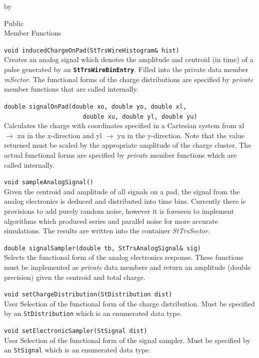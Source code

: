 \documentclass[twoside]{article}
\newcommand{\comp}[1]{\texttt{#1}}%
\newcommand{\entrylabel}[1]{\mbox{\textbf{{#1}}}\hfil}%
\newenvironment{entry}
{\begin{list}{}%
    {\renewcommand{\makelabel}{\entrylabel}%
     \setlength{\labelwidth}{90pt}%
     \setlength{\leftmargin}{\labelwidth}
     \advance\leftmargin by \labelsep%
      }%
    }%
  {\end{list}}
\newcommand{\Entrylabel}[1]%
{\raisebox{0pt}[1ex][0pt]{\makebox[\labelwidth][l]%
    {\parbox[t]{\labelwidth}{\hspace{0pt}\textbf{{#1}}}}}}
\newenvironment{Entry}%
{\renewcommand{\entrylabel}{\Entrylabel}\begin{entry}}%
  {\end{entry}}
\begin{document}
\begin{Entry}
\item[Public \\ Member Functions]

  \verb+void inducedChargeOnPad(StTrsWireHistogram& hist)+\\
  Creates an analog signal which denotes the amplitude and centroid
  (in time) of a pulse generated by an \comp{\bf StTrsWireBinEntry}.  Filled
  into the private data member {\em mSector}.  The functional forms
  of the charge distributions are specified by {\em private} member
  functions that are called internally.

  \verb+double signalOnPad(double xo, double yo, double xl,+\\
  \verb+                      double xu, double yl, double yu)+\\
  Calculates the charge with coordinates specified in a Cartesian system
  from xl $\rightarrow$ xu in the x-direction and yl $\rightarrow$ yu 
  in the y-direction.  Note that the value returned must be scaled by
  the appropriate amplitude of the charge cluster.  The actual functional
  forms are specified by {\em private} member functions which are called
  internally.

  \verb+void sampleAnalogSignal()+\\
  Given the centroid and amplitude of all signals on a pad, the signal
  from the analog electronics is deduced and distributed into time
  bins.  Currently there is provisions to add purely random noise, however
  it is foreseen to implement algorithms which produced series and
  parallel noise for more accurate simulations.  The results are
  written into the container {\em StTrsSector}.

  \verb+double signalSampler(double tb, StTrsAnalogSignal& sig)+\\
  Selects the functional form of the analog electronics response.
  These functions must be implemented as {\em private} data members
  and return an amplitude (double precision) given the centroid and
  total charge. 

  \verb+void setChargeDistribution(StDistribution dist)+\\
  User Selection of the functional form of the charge distribution.
  Must be specified by an \texttt{StDistribution} which is
  an enumerated data type.

  \verb+void setElectronicSampler(StSignal dist)+\\
  User Selection of the functional form of the signal sampler.
  Must be specified by an \texttt{StSignal} which is
  an enumerated data type.


\end{Entry}
\end{document}
